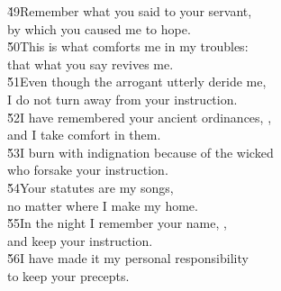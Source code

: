 \begin{poetry}
\poeml \v{49}Remember what you said to your servant, \\
\poemll    by which you caused me to hope. \\
\poeml \v{50}This is what comforts me in my troubles: \\
\poemll    that what you say revives me. \\
\poeml \v{51}Even though the arrogant utterly deride me, \\
\poemll    I do not turn away from your instruction. \\
\poeml \v{52}I have remembered your ancient ordinances, , \\
\poemll    and I take comfort in them. \\
\poeml \v{53}I burn with indignation because of the wicked \\
\poemll    who forsake your instruction. \\
\poeml \v{54}Your statutes are my songs, \\
\poemll    no matter where I make my home. \\
\poeml \v{55}In the night I remember your name, , \\
\poemll    and keep your instruction. \\
\poeml \v{56}I have made it my personal responsibility \\
\poemll    to keep your precepts.
\end{poetry}


